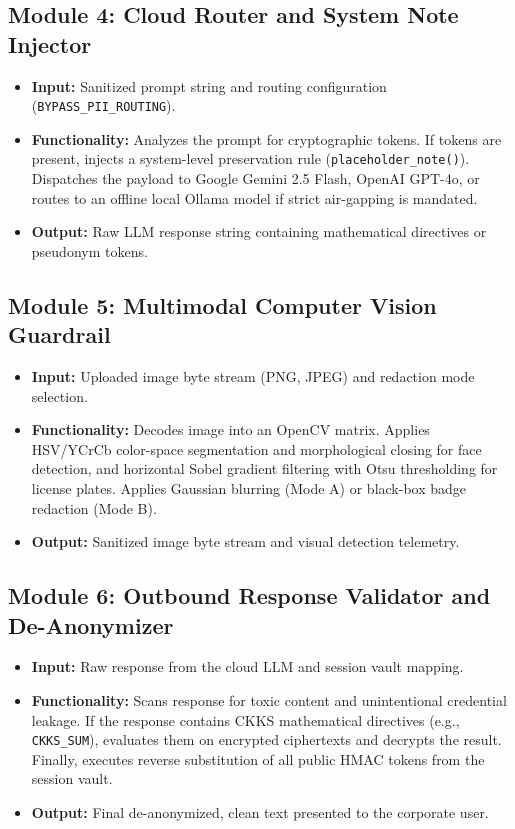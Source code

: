 \subsection{Module 4: Cloud Router and System Note Injector}
\begin{itemize}[leftmargin=*]
    \item \textbf{Input:} Sanitized prompt string and routing configuration (\texttt{BYPASS\_PII\_ROUTING}).
    \item \textbf{Functionality:} Analyzes the prompt for cryptographic tokens. If tokens are present, injects a system-level preservation rule (\texttt{placeholder\_note()}). Dispatches the payload to Google Gemini 2.5 Flash, OpenAI GPT-4o, or routes to an offline local Ollama model if strict air-gapping is mandated.
    \item \textbf{Output:} Raw LLM response string containing mathematical directives or pseudonym tokens.
\end{itemize}

\subsection{Module 5: Multimodal Computer Vision Guardrail}
\begin{itemize}[leftmargin=*]
    \item \textbf{Input:} Uploaded image byte stream (PNG, JPEG) and redaction mode selection.
    \item \textbf{Functionality:} Decodes image into an OpenCV matrix. Applies HSV/YCrCb color-space segmentation and morphological closing for face detection, and horizontal Sobel gradient filtering with Otsu thresholding for license plates. Applies Gaussian blurring (Mode A) or black-box badge redaction (Mode B).
    \item \textbf{Output:} Sanitized image byte stream and visual detection telemetry.
\end{itemize}

\subsection{Module 6: Outbound Response Validator and De-Anonymizer}
\begin{itemize}[leftmargin=*]
    \item \textbf{Input:} Raw response from the cloud LLM and session vault mapping.
    \item \textbf{Functionality:} Scans response for toxic content and unintentional credential leakage. If the response contains CKKS mathematical directives (e.g., \texttt{CKKS\_SUM}), evaluates them on encrypted ciphertexts and decrypts the result. Finally, executes reverse substitution of all public HMAC tokens from the session vault.
    \item \textbf{Output:} Final de-anonymized, clean text presented to the corporate user.
\end{itemize}

